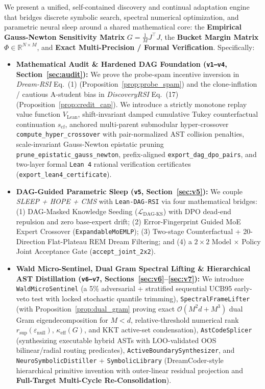 \documentclass[11pt,a4paper]{article}
\begin{document}
We present a unified, self-contained discovery and continual adaptation engine that bridges discrete symbolic search, spectral numerical optimization, and parametric neural sleep around a shared mathematical core: the \textbf{Empirical Gauss-Newton Sensitivity Matrix} $G = \frac{1}{M}J^\top J$, the \textbf{Bucket Margin Matrix} $\Phi \in \mathbb{R}^{N \times M}$, and \textbf{Exact Multi-Precision / Formal Verification}. Specifically:
\begin{itemize}
\item \textbf{Mathematical Audit \& Hardened DAG Foundation (\texttt{v1--v4}, Section~\ref{sec:audit}):} We prove the probe-spam incentive inversion in \emph{Dream-RSI} Eq.~(1) (Proposition~\ref{prop:probe_spam}) and the clone-inflation / cautious A-student bias in \emph{DiscoveryRSI} Eq.~(17) (Proposition~\ref{prop:credit_cap}). We introduce a strictly monotone replay value function $V_{\text{Lean}}$, shift-invariant damped cumulative Tukey counterfactual continuation $s_{\text{cf}}$, anchored multi-parent submodular hyper-crossover \texttt{compute\_hyper\_crossover} with pair-normalized AST collision penalties, scale-invariant Gauss-Newton epistatic pruning \texttt{prune\_epistatic\_gauss\_newton}, prefix-aligned \texttt{export\_dag\_dpo\_pairs}, and two-layer formal \texttt{Lean 4} rational verification certificates (\texttt{export\_lean4\_certificate}).
\item \textbf{DAG-Guided Parametric Sleep (\texttt{v5}, Section~\ref{sec:v5}):} We couple \emph{SLEEP + HOPE + CMS} with \texttt{Lean-DAG-RSI} via four mathematical bridges: (1) DAG-Masked Knowledge Seeding ($\mathcal{L}_{\text{DAG-KS}}$) with DPO dead-end repulsion and zero base-expert drift; (2) Error-Fingerprint Guided MoE Expert Crossover (\texttt{ExpandableMoEMLP}); (3) Two-stage Counterfactual + 20-Direction Flat-Plateau REM Dream Filtering; and (4) a $2\times 2$ Model $\times$ Policy Joint Acceptance Gate (\texttt{accept\_joint\_2x2}).
\item \textbf{Wald Micro-Sentinel, Dual Gram Spectral Lifting \& Hierarchical AST Distillation (\texttt{v6--v7}, Sections~\ref{sec:v6}--\ref{sec:v7}):} We introduce \texttt{WaldMicroSentinel} (a 5\% adversarial + stratified sequential UCB95 early-veto test with locked stochastic quantile trimming), \texttt{SpectralFrameLifter} (with Proposition~\ref{prop:dual_gram} proving exact $\mathcal{O}(M^2 d + M^3)$ dual Gram eigendecomposition for $M < d$, relative-threshold numerical rank $r_{\sup}(\varepsilon_{\text{null}})$, $\kappa_{\text{eff}}(G)$, and KKT active-set condensation), \texttt{AstCodeSplicer} (synthesizing executable hybrid ASTs with LOO-validated OOS bilinear/radial routing predicates), \texttt{ActiveBoundarySynthesizer}, and \texttt{NeuroSymbolicDistiller} + \texttt{SymbolicLibrary} (DreamCoder-style \cite{dreamcoder2021} hierarchical primitive invention with outer-linear residual projection and \textbf{Full-Target Multi-Cycle Re-Consolidation}).

\end{itemize}
\end{document}
